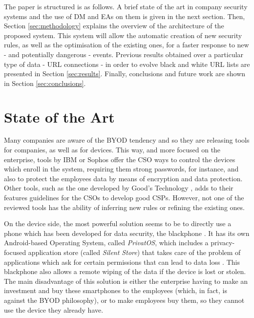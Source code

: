 \documentclass{sig-alternate}
\begin{document}
The paper is structured is as follows. A brief state of the art in company security systems and the use of DM and EAs on them is given in the next section. Then, Section \ref{sec:methodology} explains the overview of the architecture of the proposed system. This system will allow the automatic creation of new security rules, as well as the optimisation of the existing ones, for a faster response to new - and potentially dangerous - events. Previous results obtained over a particular type of data - URL connections - in order to evolve black and white URL lists are presented in Section \ref{sec:results}. Finally, conclusions and future work are shown in Section \ref{sec:conclusions}.

%
%
\section{State of the Art}
\label{sec:sota}

Many companies are aware of the BYOD tendency and so they are releasing tools for companies, as well as for devices. This way, and more focused on the enterprise, tools by IBM \cite{IBM_tool} or Sophos \cite{Sophos_tool} offer the CSO ways to control the devices which enroll in the system, requiring them strong passwords, for instance, and also to protect the employees data by means of encryption and data protection. Other tools, such as the one developed by Good's Technology \cite{Good_tool}, adds to their features guidelines for the CSOs to develop good CSPs. However, not one of the reviewed tools has the ability of inferring new rules or refining the existing ones.

On the device side, the most powerful solution seems to be to directly use a phone which has been developed for data security, the blackphone \cite{Blackphone_site}. It has its own Android-based Operating System, called \textit{PrivatOS}, which includes a privacy-focused application store (called \textit{Silent Store}) that takes care of the problem of applications which ask for certain permissions that can lead to data loss \cite{gangula2013survey}. This blackphone also allows a remote wiping of the data if the device is lost or stolen. The main disadvantage of this solution is either the enterprise having to make an investment and buy these smartphones to the employees (which, in fact, is against the BYOD philosophy), or to make employees buy them, so they cannot use the device they already have.
\end{document}
